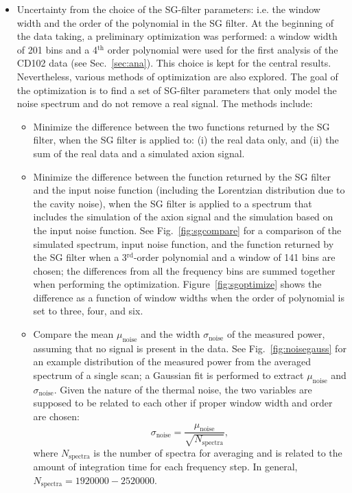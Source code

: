 \begin{itemize}
\item Uncertainty from the choice of the SG-filter parameters: i.e.  
the window width and the order of the polynomial in the SG filter. At the 
beginning of the data taking, a preliminary optimization was performed: a 
window width of 201 bins and a 4$^\text{th}$ order polynomial were used for 
the first analysis of the CD102 data (see Sec.~\ref{sec:ana}). 
This choice is kept for the central results. 
Nevertheless, various methods of optimization are also explored. The goal 
of the optimization is to find a set of SG-filter parameters that only 
model the noise spectrum and do not remove a real signal. 
The methods include:
\begin{itemize}
 \item Minimize the difference between the two functions returned by the SG 
filter, when the SG filter is applied to: (i) the real data only, and (ii) 
the sum of the real data and a simulated axion signal. 
 \item Minimize the difference between the function returned by the 
 SG filter and the input noise function (including the Lorentzian distribution 
due to the cavity noise), when the SG filter is applied to
a spectrum that includes the simulation of the axion signal and 
the simulation based on the input noise function. See Fig.~\ref{fig:sgcompare} 
for a comparison of  the simulated spectrum, input noise function, and the 
function returned by 
 the SG filter when a 3$^\text{rd}$-order polynomial and a window of 141 
 bins are chosen; the differences from all the frequency bins are summed 
 together when performing the optimization.
 Figure~\ref{fig:sgoptimize} shows the difference 
as a function of window widths when the order of polynomial is 
 set to three, four, and six. 
 \item Compare the mean $\mu_\text{noise}$ and the width $\sigma_\text{noise}$ 
of the measured power, assuming that no signal is present in the 
data. See Fig.~\ref{fig:noisegauss} for an example distribution 
of the measured power from the averaged spectrum of a 
single scan; %
a Gaussian fit is performed to extract 
$\mu_\text{noise}$ and $\sigma_\text{noise}$. Given the nature of the 
thermal noise, the two variables are supposed to be related to 
each other if proper window width and order are chosen:
\begin{equation*} 
\sigma_\text{noise} = \frac{\mu_\text{noise}}{\sqrt{N_\text{spectra}}},
\end{equation*}
where $N_\text{spectra}$ is the number of spectra for averaging and 
is related to the amount of integration time for each frequency step. In 
general, $N_\text{spectra}=1920000-2520000$. 
\end{itemize}


\end{itemize}
